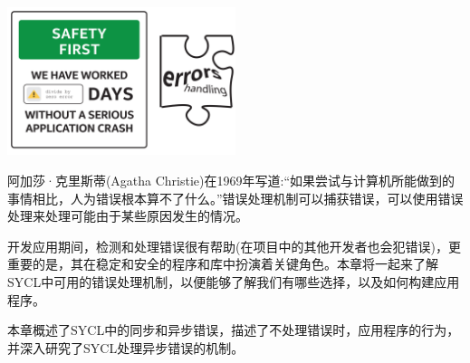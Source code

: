 \begin{center}
	\includegraphics[width=0.5\textwidth]{content/chapter-5/images/1}
\end{center}

阿加莎·克里斯蒂(Agatha Christie)在1969年写道:“如果尝试与计算机所能做到的事情相比，人为错误根本算不了什么。”错误处理机制可以捕获错误，可以使用错误处理来处理可能由于某些原因发生的情况。\par

开发应用期间，检测和处理错误很有帮助(在项目中的其他开发者也会犯错误)，更重要的是，其在稳定和安全的程序和库中扮演着关键角色。本章将一起来了解SYCL中可用的错误处理机制，以便能够了解我们有哪些选择，以及如何构建应用程序。\par

本章概述了SYCL中的同步和异步错误，描述了不处理错误时，应用程序的行为，并深入研究了SYCL处理异步错误的机制。\par